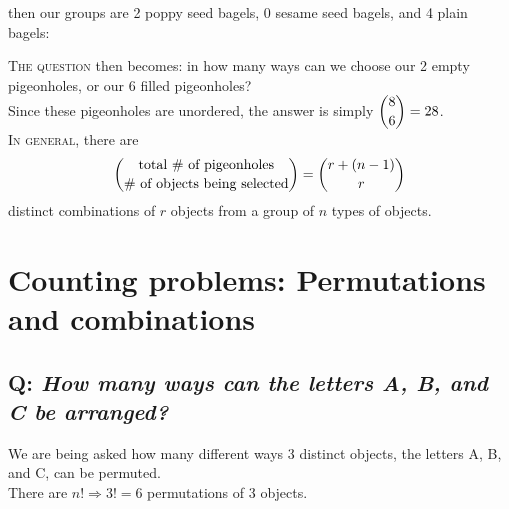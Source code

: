\documentclass{article}
\begin{document}
then our groups are 2 poppy seed bagels, 0 sesame seed bagels, and 4 plain bagels:
\begin{center}
\end{center}
\textsc{The question} then becomes: in how many ways can we choose our 2 empty pigeonholes, or our 6 filled pigeonholes?\\[1ex]
Since these pigeonholes are unordered, the answer is simply $\dbinom{8}{6}=28$.\\[1ex]
\textsc{In general,} there are
\begin{equation*}
\dbinom{\text{total \# of pigeonholes}}{\text{\# of objects being selected}}=\dbinom{r+(n-1)}{r}
\end{equation*}
distinct combinations of $r$ objects from a group of $n$ types of objects.

\section{\sc Counting problems: Permutations and combinations}

\subsection*{Q: {\em How many ways can the letters A, B, and C be arranged?}}
We are being asked how many different ways 3 distinct objects, the letters A, B, and C, can be permuted.\\[1ex]
There are $n!\Rightarrow 3!=6$ permutations of 3 objects.
\end{document}

